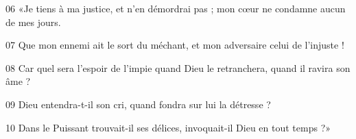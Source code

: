 
06 «Je tiens à ma justice, et n’en démordrai pas ; mon cœur ne condamne aucun de mes jours.

07 Que mon ennemi ait le sort du méchant, et mon adversaire celui de l’injuste !

08 Car quel sera l’espoir de l’impie quand Dieu le retranchera, quand il ravira son âme ?

09 Dieu entendra-t-il son cri, quand fondra sur lui la détresse ?

10 Dans le Puissant trouvait-il ses délices, invoquait-il Dieu en tout temps ?»
